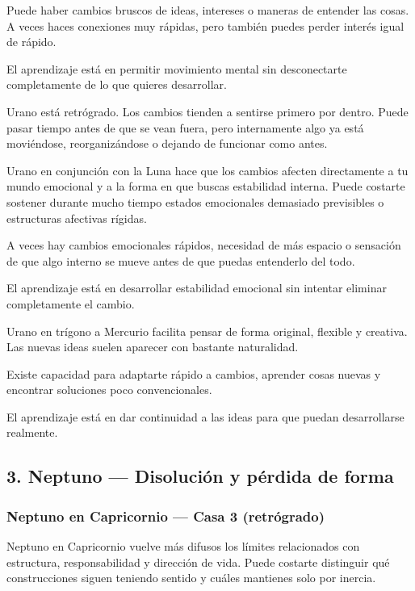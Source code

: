 \documentclass[11pt,a4paper]{article}
\begin{document}
Puede haber cambios bruscos de ideas, intereses o maneras de entender las cosas. A veces haces conexiones muy rápidas, pero también puedes perder interés igual de rápido.

El aprendizaje está en permitir movimiento mental sin desconectarte completamente de lo que quieres desarrollar.

Urano está retrógrado. Los cambios tienden a sentirse primero por dentro. Puede pasar tiempo antes de que se vean fuera, pero internamente algo ya está moviéndose, reorganizándose o dejando de funcionar como antes.

Urano en conjunción con la Luna hace que los cambios afecten directamente a tu mundo emocional y a la forma en que buscas estabilidad interna. Puede costarte sostener durante mucho tiempo estados emocionales demasiado previsibles o estructuras afectivas rígidas.

A veces hay cambios emocionales rápidos, necesidad de más espacio o sensación de que algo interno se mueve antes de que puedas entenderlo del todo.

El aprendizaje está en desarrollar estabilidad emocional sin intentar eliminar completamente el cambio.

Urano en trígono a Mercurio facilita pensar de forma original, flexible y creativa. Las nuevas ideas suelen aparecer con bastante naturalidad.

Existe capacidad para adaptarte rápido a cambios, aprender cosas nuevas y encontrar soluciones poco convencionales.

El aprendizaje está en dar continuidad a las ideas para que puedan desarrollarse realmente.

\vspace{0.8cm}

\subsection{3. Neptuno — Disolución y pérdida de forma}

\subsubsection*{Neptuno en Capricornio — Casa 3 (retrógrado)}

Neptuno en Capricornio vuelve más difusos los límites relacionados con estructura, responsabilidad y dirección de vida. Puede costarte distinguir qué construcciones siguen teniendo sentido y cuáles mantienes solo por inercia.
\end{document}
